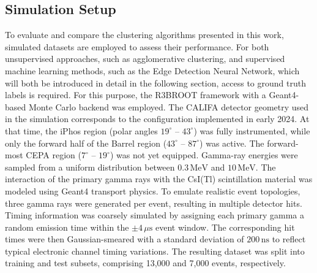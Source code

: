\documentclass[final,5p,times,twocolumn]{elsarticle}
\begin{document}
\subsection{Simulation Setup}\label{s_sec:data_sim}
To evaluate and compare the clustering algorithms presented in this work, simulated datasets are employed to assess their performance. For both unsupervised approaches, such as agglomerative clustering, and supervised machine learning methods, such as the Edge Detection Neural Network, which will both be introduced in detail in the following section, access to ground truth labels is required. For this purpose, the R3BROOT framework with a Geant4-based Monte Carlo \cite{agostinelli2003geant4} backend was employed.\newline
The CALIFA detector geometry used in the simulation corresponds to the configuration implemented in early 2024. At that time, the iPhos region (polar angles $19^\circ$ -- $43^\circ$) was fully instrumented, while only the forward half of the Barrel region ($43^\circ$ -- $87^\circ$) was active. The forward-most CEPA region ($7^\circ$ -- $19^\circ$) was not yet equipped.\newline
Gamma-ray energies were sampled from a uniform distribution between $0.3\,\mathrm{MeV}$ and $10\,\mathrm{MeV}$. The interaction of the primary gamma rays with the CsI(Tl) scintillation material was modeled using Geant4 transport physics.\newline
To emulate realistic event topologies, three gamma rays were generated per event, resulting in multiple detector hits. Timing information was coarsely simulated by assigning each primary gamma a random emission time within the $\pm 4\,\mu\mathrm{s}$ event window. The corresponding hit times were then Gaussian-smeared with a standard deviation of $200\,\mathrm{ns}$ to reflect typical electronic channel timing variations.\newline
The resulting dataset was split into training and test subsets, comprising 13{,}000 and 7{,}000 events, respectively.
\end{document}
